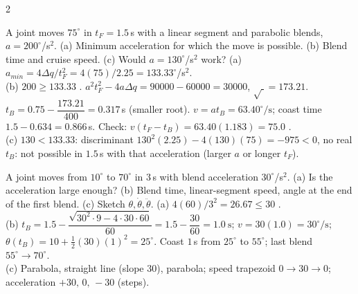 \begin{multicols}{2}
\begin{examq}
A joint moves $75^\circ$ in $t_F=1.5$\,s with a linear segment and parabolic blends, $a=200^\circ$/s$^2$. (a) Minimum acceleration for which the move is possible. (b) Blend time and cruise speed. (c) Would $a=130^\circ$/s$^2$ work?
\solution
(a) $a_{min}=4\Delta q/t_F^2=4(75)/2.25=133.33^\circ$/s$^2$.\\
(b) $200\ge133.33$ \checkmark. $a^2t_F^2-4a\Delta q=90000-60000=30000$, $\sqrt{\ }=173.21$. $t_B=0.75-\dfrac{173.21}{400}=0.317$\,s (smaller root). $v=at_B=\boxed{63.40^\circ/\text{s}}$; coast time $1.5-0.634=0.866$\,s. Check: $v(t_F-t_B)=63.40(1.183)=75.0$ \checkmark.\\
(c) $130<133.33$: discriminant $130^2(2.25)-4(130)(75)=-975<0$, no real $t_B$: not possible in $1.5$\,s with that acceleration (larger $a$ or longer $t_F$). \chk
\end{examq}

\begin{examq}
A joint moves from $10^\circ$ to $70^\circ$ in $3$\,s with blend acceleration $30^\circ$/s$^2$. (a) Is the acceleration large enough? (b) Blend time, linear-segment speed, angle at the end of the first blend. (c) Sketch $\theta,\dot\theta,\ddot\theta$.
\solution
(a) $4(60)/3^2=26.67\le30$ \checkmark.\\
(b) $t_B=1.5-\dfrac{\sqrt{30^2\cdot9-4\cdot30\cdot60}}{60}=1.5-\dfrac{30}{60}=\boxed{1.0\ \text{s}}$; $v=30(1.0)=\boxed{30^\circ/\text{s}}$; $\theta(t_B)=10+\tfrac12(30)(1)^2=\boxed{25^\circ}$. Coast $1$\,s from $25^\circ$ to $55^\circ$; last blend $55^\circ\to70^\circ$.\\
(c) Parabola, straight line (slope $30$), parabola; speed trapezoid $0\to30\to0$; acceleration $+30,\,0,\,-30$ (steps).
 \chk
\end{examq}


\end{multicols}
